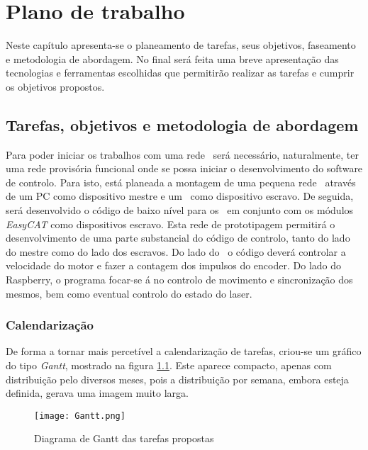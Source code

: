 \chapter{Plano de trabalho}\label{chap:chap3}

Neste capítulo apresenta-se o planeamento de tarefas, seus objetivos,
faseamento e metodologia de abordagem. No final será feita uma breve
apresentação das tecnologias e ferramentas escolhidas que permitirão
realizar as tarefas e cumprir os objetivos propostos.


\section{Tarefas, objetivos e metodologia de abordagem}

Para poder iniciar os trabalhos com uma rede \ecat\, será necessário,
naturalmente, ter uma rede provisória funcional onde se possa iniciar o
desenvolvimento do software de controlo. Para isto, está planeada a
montagem de uma pequena rede \ecat\ através de um PC como dispositivo
mestre e um \raspi\ como dispositivo escravo. De seguida, será desenvolvido
o código de baixo nível para os \arduino\ em conjunto com os módulos
\emph{EasyCAT} como dispositivos escravo. Esta rede de prototipagem
permitirá o desenvolvimento de uma parte substancial do código de controlo,
tanto do lado do mestre como do lado dos escravos. Do lado do \arduino\
o código deverá controlar a velocidade do motor e fazer a contagem dos
impulsos do encoder. Do lado do Raspberry, o programa focar-se á no 
controlo de movimento e sincronização dos mesmos, bem como eventual controlo
do estado do laser.

\subsection{Calendarização}
De forma a tornar mais percetível a calendarização de tarefas, criou-se
um gráfico do tipo \emph{Gantt}, mostrado na figura \ref{fig:gantt}. Este
aparece compacto, apenas com distribuição pelo diversos meses, pois a
distribuição por semana, embora esteja definida, gerava uma imagem muito
larga.

\begin{figure}[htp]
 \centering
 \texttt{[image: Gantt.png]}
 \caption{Diagrama de Gantt das tarefas propostas}
 \label{fig:gantt}
\end{figure}


